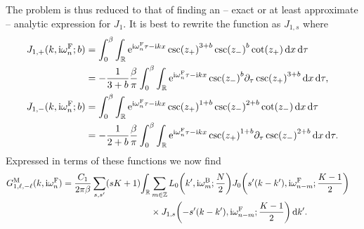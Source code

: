 \documentclass[english, parskip=full]{scrartcl}
\begin{document}
The problem is thus reduced to that of finding an -- exact or at least approximate -- analytic expression for $J_1$.
It is best to rewrite the function as $J_{1,s}$ where
\begin{align}
J_{1,+}(k,\i\omega_n^\F; b) &= \intx{0}{\beta}{\intr{\powe{\i \omega_n^\F\tau - \i kx} \csc\kla*{z_+}^{3+b} \csc\kla*{z_-}^{b} \cot\kla*{z_+} }{x} }{\tau}\\
&= -\frac{1}{3+b} \frac{\beta}{\pi} \intx{0}{\beta}{\intr{\powe{\i \omega_n^\F\tau - \i kx} \csc\kla*{z_-}^{b} \partial_\tau \csc\kla*{z_+}^{3+b} }{x} }{\tau},\\
J_{1,-}(k,\i\omega_n^\F; b) &= \intx{0}{\beta}{\intr{\powe{\i \omega_n^\F\tau - \i kx} \csc\kla*{z_+}^{1+b} \csc\kla*{z_-}^{2+b} \cot\kla*{z_-} }{x} }{\tau}\\
&= -\frac{1}{2+b} \frac{\beta}{\pi} \intx{0}{\beta}{\intr{\powe{\i \omega_n^\F\tau - \i kx} \csc\kla*{z_+}^{1+b} \partial_\tau \csc\kla*{z_-}^{2+b} }{x} }{\tau}.
\end{align}
Expressed in terms of these functions we now find
\begin{align}
G_{1,\ell,-\ell}^\M(k,\i\omega_n^\F) &= \frac{C_1}{2\pi\beta} \sum_{s,s'} (sK+1) \bsplit{\intr{ &\sum_{m\in\mathbb{Z}}  L_0\kla*{k', \i \omega_m^\B; \frac{N}{2}} J_0\kla*{s'(k-k'), \i \omega_{n-m}^\F; \frac{K-1}{2}}\\
&\times J_{1,s}\kla*{-s'(k-k'), \i \omega_{n-m}^\F; \frac{K-1}{2}} }{k'}.}
\end{align}
\end{document}
